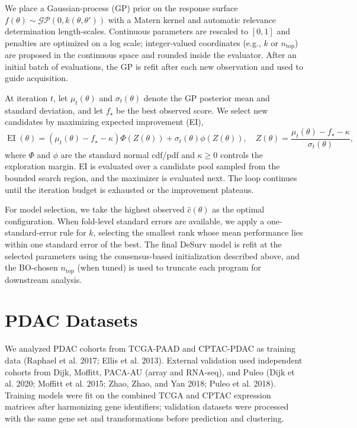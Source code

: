 \documentclass[
]{article}
\begin{document}
We place a Gaussian-process (GP) prior on the response surface
\(f(\theta) \sim \mathcal{GP}(0, k(\theta,\theta'))\) with a
Mat\textquotesingle ern kernel and automatic relevance determination
length-scales. Continuous parameters are rescaled to \([0,1]\) and
penalties are optimized on a log scale; integer-valued coordinates
(e.g., \(k\) or \(n_{\text{top}}\)) are proposed in the continuous space
and rounded inside the evaluator. After an initial batch of evaluations,
the GP is refit after each new observation and used to guide
acquisition.

At iteration \(t\), let \(\mu_t(\theta)\) and \(\sigma_t(\theta)\)
denote the GP posterior mean and standard deviation, and let \(f_\star\)
be the best observed score. We select new candidates by maximizing
expected improvement (EI), \[
\operatorname{EI}(\theta) =
\left(\mu_t(\theta) - f_\star - \kappa\right)\Phi(Z(\theta))
  + \sigma_t(\theta)\phi(Z(\theta)),
\quad
Z(\theta) = \frac{\mu_t(\theta) - f_\star - \kappa}{\sigma_t(\theta)},
\] where \(\Phi\) and \(\phi\) are the standard normal cdf/pdf and
\(\kappa \ge 0\) controls the exploration margin. EI is evaluated over a
candidate pool sampled from the bounded search region, and the maximizer
is evaluated next. The loop continues until the iteration budget is
exhausted or the improvement plateaus.

For model selection, we take the highest observed \(\hat{c}(\theta)\) as
the optimal configuration. When fold-level standard errors are
available, we apply a one-standard-error rule for \(k\), selecting the
smallest rank whose mean performance lies within one standard error of
the best. The final DeSurv model is refit at the selected parameters
using the consensus-based initialization described above, and the
BO-chosen \(n_{\text{top}}\) (when tuned) is used to truncate each
program for downstream analysis.

\section{PDAC Datasets}

We analyzed PDAC cohorts from TCGA-PAAD and CPTAC-PDAC as training data
(Raphael et al. 2017; Ellis et al. 2013). External validation used
independent cohorts from Dijk, Moffitt, PACA-AU (array and RNA-seq), and
Puleo (Dijk et al. 2020; Moffitt et al. 2015; Zhao, Zhao, and Yan 2018;
Puleo et al. 2018). Training models were fit on the combined TCGA and
CPTAC expression matrices after harmonizing gene identifiers; validation
datasets were processed with the same gene set and transformations
before prediction and clustering.
\end{document}
